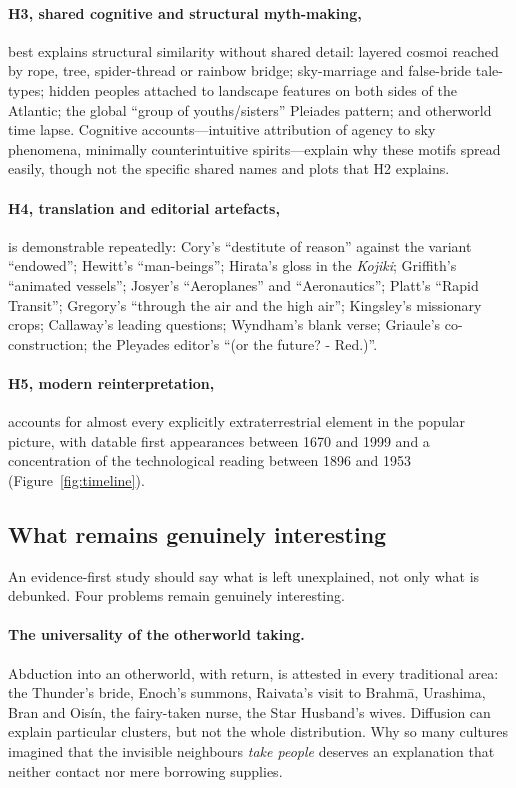 \documentclass[11pt,a4paper]{article}
\begin{document}
\paragraph{H3, shared cognitive and structural myth-making,} best explains structural similarity without shared detail: layered cosmoi reached by rope, tree, spider-thread or rainbow bridge; sky-marriage and false-bride tale-types; hidden peoples attached to landscape features on both sides of the Atlantic; the global ``group of youths/sisters'' Pleiades pattern; and otherworld time lapse. Cognitive accounts---intuitive attribution of agency to sky phenomena, minimally counterintuitive spirits---explain why these motifs spread easily, though not the specific shared names and plots that H2 explains.

\paragraph{H4, translation and editorial artefacts,} is demonstrable repeatedly: Cory's ``destitute of reason'' against the variant ``endowed''; Hewitt's ``man-beings''; Hirata's gloss in the \emph{Kojiki}; Griffith's ``animated vessels''; Josyer's ``Aeroplanes'' and ``Aeronautics''; Platt's ``Rapid Transit''; Gregory's ``through the air and the high air''; Kingsley's missionary crops; Callaway's leading questions; Wyndham's blank verse; Griaule's co-construction; the Pleyades editor's ``(or the future? - Red.)''.

\paragraph{H5, modern reinterpretation,} accounts for almost every explicitly extraterrestrial element in the popular picture, with datable first appearances between 1670 and 1999 and a concentration of the technological reading between 1896 and 1953 (Figure~\ref{fig:timeline}).

\subsection{What remains genuinely interesting}

An evidence-first study should say what is left unexplained, not only what is debunked. Four problems remain genuinely interesting.

\paragraph{The universality of the otherworld taking.} Abduction into an otherworld, with return, is attested in every traditional area: the Thunder's bride, Enoch's summons, Raivata's visit to Brahmā, Urashima, Bran and Oisín, the fairy-taken nurse, the Star Husband's wives. Diffusion can explain particular clusters, but not the whole distribution. Why so many cultures imagined that the invisible neighbours \emph{take people} deserves an explanation that neither contact nor mere borrowing supplies.
\end{document}
